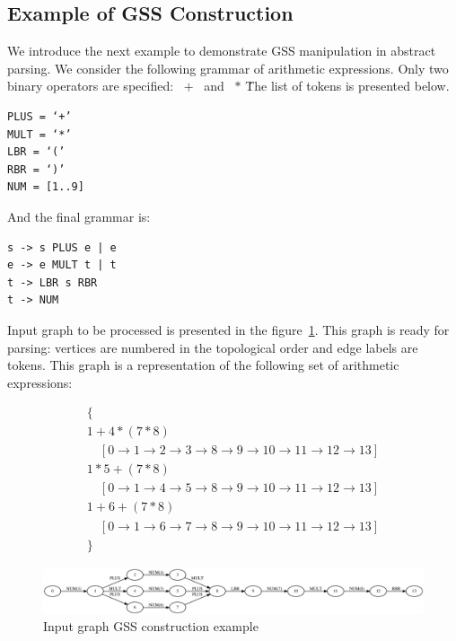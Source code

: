 \documentclass{sigplanconf}
\begin{document}
\subsection{Example of GSS Construction}

We introduce the next example to demonstrate GSS manipulation in abstract parsing. We consider the following grammar of arithmetic expressions. Only two binary operators are specified: \ $+$ \ and \ $*$ \. The list of tokens is presented below.

\begin{verbatim}
PLUS = ‘+’
MULT = ‘*’
LBR = ‘(’
RBR = ‘)’
NUM = [1..9]
\end{verbatim}

And the final grammar is:

\begin{verbatim}
s -> s PLUS e | e
e -> e MULT t | t
t -> LBR s RBR
t -> NUM
\end{verbatim}

Input graph to be processed is presented in the figure~\ref{input}. This graph is ready for parsing: vertices are numbered in the topological order and edge labels are tokens. This graph is a representation of the following set of arithmetic expressions:

\begin{equation*}
\begin{array}{l}
\{ \\
1+4*(7*8)\ \\ \quad [0 \to 1 \to 2 \to 3 \to 8 \to 9 \to 10 \to 11 \to 12 \to 13] \\
1*5+(7*8)\ \\ \quad [0 \to 1 \to 4 \to 5 \to 8 \to 9 \to 10 \to 11 \to 12 \to 13] \\
1+6+(7*8)\ \\ \quad [0 \to 1 \to 6 \to 7 \to 8 \to 9 \to 10 \to 11 \to 12 \to 13] \\
\}
\end{array}
\end{equation*}

\begin{figure}
    \begin{center}
        \includegraphics[scale=0.4]{Graphs/input1.eps}
    \end{center}
    \caption{Input graph GSS construction example}
    \label{input}
\end{figure}
\end{document}
